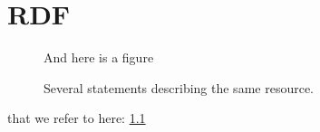 \documentclass[a4paper,11pt]{kth-mag}
\begin{document}



\appendix
\addappheadtotoc
\chapter{RDF}\label{appA}

\begin{figure}[ht]
\begin{center}
And here is a figure
\caption{\small{Several statements describing the same resource.}}\label{RDF_4}
\end{center}
\end{figure}

that we refer to here: \ref{RDF_4}
\end{document}
